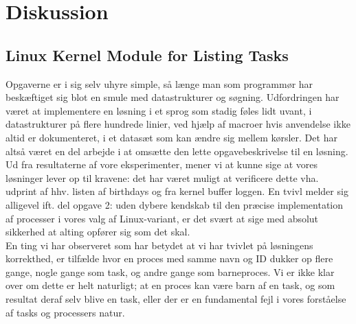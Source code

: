 \documentclass[main.tex]{subfile}
\begin{document}
\section{Diskussion}

\subsection{Linux Kernel Module for Listing Tasks}
Opgaverne er i sig selv uhyre simple, så længe man som programmør har beskæftiget sig blot en smule med datastrukturer og søgning. Udfordringen har været at implementere en løsning i et sprog som stadig føles lidt uvant, i datastrukturer på flere hundrede linier, ved hjælp af macroer hvis anvendelse ikke altid er dokumenteret, i et datasæt som kan ændre sig mellem kørsler. Det har altså været en del arbejde i at omsætte den lette opgavebeskrivelse til en løsning.\\

Ud fra resultaterne af vore eksperimenter, mener vi at kunne sige at vores løsninger lever op til kravene: det har været muligt at verificere dette vha. udprint af hhv. listen af birthdays og fra kernel buffer loggen. En tvivl melder sig alligevel ift. del opgave 2: uden dybere kendskab til den præcise implementation af processer i vores valg af Linux-variant, er det svært at sige med absolut sikkerhed at alting opfører sig som det skal.\\

En ting vi har observeret som har betydet at vi har tvivlet på løsningens korrekthed, er tilfælde hvor en proces med samme navn og ID dukker op flere gange, nogle gange som task, og andre gange som barneproces. Vi er ikke klar over om dette er helt naturligt; at en proces kan være barn af en task, og som resultat deraf selv blive en task, eller der er en fundamental fejl i vores forståelse af tasks og processers natur.
\end{document}
